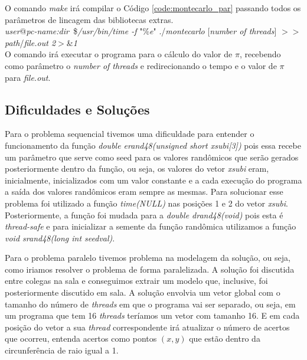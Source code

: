 \documentclass[11pt,twoside]{article}
\begin{document}
            O comando {\it make} irá compilar o Código \ref{code:montecarlo_par}
            passando todos os parâmetros de lincagem das bibliotecas extras.\\
                
            {\it user}@{\it pc-name:dir~}\${\it /usr/bin/time -f }"\%{\it e}" ./{\it montecarlo}
            [{\it number of threads}] $>>$ {\it path}/{\it file.out 2}$>$\&{\it 1}\\
            
            O comando irá executar o programa para o cálculo do valor de $\pi$, recebendo como 
            parâmetro o {\it number of threads} e redirecionando o tempo e o valor de $\pi$
            para {\it file.out}.


    \subsection{Dificuldades e Soluções}
    
        Para o problema sequencial tivemos uma dificuldade para entender o funcionamento da
        função {\it double erand48(unsigned short xsubi[3])} pois essa recebe um parâmetro que
        serve como seed para os valores randômicos que serão gerados posteriormente dentro da
        função, ou seja, os valores do vetor {\it xsubi} eram, inicialmente, inicializados com
        um valor constante e a cada execução do programa a saída dos valores randômicos
        eram sempre as mesmas. Para solucionar esse problema foi utilizado a função
        {\it time(NULL)} nas posições 1 e 2 do vetor {\it xsubi}. Posteriormente, a função
        foi mudada para a {\it double drand48(void)} pois esta é {\it thread-safe} e para
        inicializar a semente da função randômica utilizamos a função
        {\it void srand48(long int seedval)}.
        
        Para o problema paralelo tivemos problema na modelagem da solução, ou seja, como
        iriamos resolver o problema de forma paralelizada. A solução foi discutida entre
        colegas na sala e conseguimos extrair um modelo que, inclusive, foi posteriormente
        discutido em sala. A solução envolvia um vetor global com o tamanho do número de
        {\it threads} em que o programa vai ser separado, ou seja, em um programa que tem 16
        {\it threads} teríamos um vetor com tamanho 16. E em cada posição do vetor a sua
        {\it thread} correspondente irá atualizar o número de acertos que ocorreu, entenda
        acertos como pontos $(x,y)$ que estão dentro da circunferência de raio igual a 1.
\end{document}
